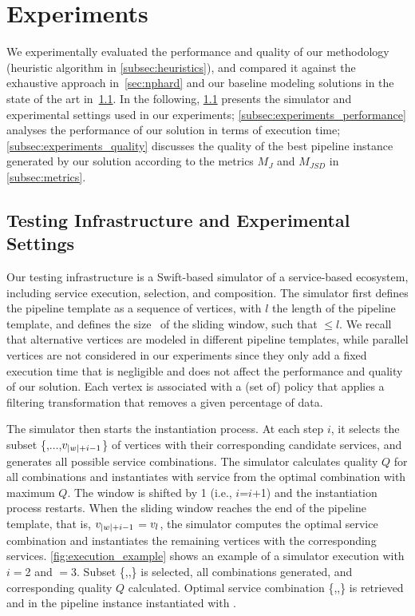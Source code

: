 \section{Experiments}\label{sec:experiment}
We experimentally evaluated the performance and quality of our methodology (heuristic algorithm in \cref{subsec:heuristics}), and compared it against the exhaustive approach in~\cref{sec:nphard} {\color{OurColor}and our baseline modeling solutions in the state of the art in~\cref{subsec:experiments_infrastructure}.} In the following,
\cref{subsec:experiments_infrastructure} presents the simulator and experimental settings used in our experiments;
\cref{subsec:experiments_performance} analyses the performance of our solution in terms of execution time; \cref{subsec:experiments_quality} discusses the quality of the best pipeline instance generated by our solution according to the metrics $M_J$ and $M_{JSD}$ in \cref{subsec:metrics}.

\subsection{Testing Infrastructure and Experimental Settings}\label{subsec:experiments_infrastructure}
Our testing infrastructure is a Swift-based simulator of a service-based ecosystem, including service execution, selection, and composition.
The simulator first defines the pipeline template as a sequence of vertices, with $l$ the length of the pipeline template, and defines the size \windowsize\ of the sliding window, such that \windowsize$\leq$$l$. We recall that alternative vertices are modeled in different pipeline templates, while parallel vertices are not considered in our experiments since they only add a fixed execution time that is negligible and does not affect the performance and quality of our solution. Each vertex is associated with a (set of) policy that applies a filtering transformation that removes a given percentage of data.


      The simulator then starts the instantiation process. At each step $i$, it selects the subset \{,$\ldots$,$v_{|w|+i-1}$\} of vertices with their corresponding candidate services, and generates all possible service combinations. The simulator calculates quality $Q$ for all combinations and instantiates  with service  from the optimal combination with maximum $Q$. The window is shifted by 1 (i.e., $i$=$i$+1) and the instantiation process restarts. When the sliding window reaches the end of the pipeline template, that is, $v_{|w|+i-1}$$=$$v_{l}$, the simulator computes the optimal service combination and instantiates the remaining vertices with the corresponding services. \cref{fig:execution_example} shows an example of a simulator execution with $i$$=$2 and \windowsize$=$3. Subset \{,,\} is selected, all combinations generated, and corresponding quality $Q$ calculated. Optimal service combination \{,,\} is retrieved and  in the pipeline instance instantiated with .

